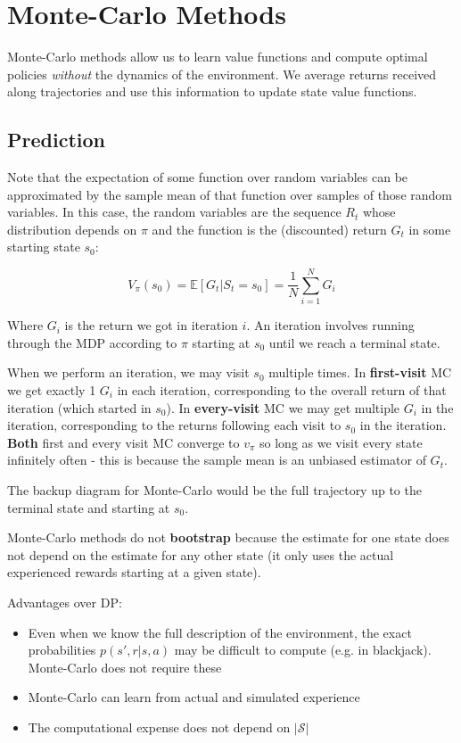 \documentclass[11pt]{report}
\begin{document}
\chapter{Monte-Carlo Methods}\label{sec:Monte-Carlo Methods}
Monte-Carlo methods allow us to learn value functions and compute optimal policies \textit{without} the dynamics of the environment. We average returns received along trajectories and use this information to update state value functions.

\section{Prediction}
Note that the expectation of some function over random variables can be approximated by the sample mean of that function over samples of those random variables. In this case, the random variables are the sequence $R_t$ whose distribution depends on $\pi$ and the function is the (discounted) return $G_t$ in some starting state $s_0$:

\begin{equation}
	\label{eqn:mc-update}
	V_\pi(s_0) = \mathbb{E}[G_t | S_t =s_0] = \frac{1}{N} \sum_{i=1}^{N}G_i
\end{equation}

Where $G_i$ is the return we got in iteration $i$. An iteration involves running through the MDP according to $\pi$ starting at $s_0$ until we reach a terminal state.

When we perform an iteration, we may visit $s_0$ multiple times. In \textbf{first-visit} MC we get exactly 1 $G_i$ in each iteration, corresponding to the overall return of that iteration (which started in $s_0$). In \textbf{every-visit} MC we may get multiple $G_i$ in the iteration, corresponding to the returns following each visit to $s_0$ in the iteration. \textbf{Both} first and every visit MC converge to $v_\pi$ so long as we visit every state infinitely often - this is because the sample mean is an unbiased estimator of $G_t$.

The backup diagram for Monte-Carlo would be the full trajectory up to the terminal state and starting at $s_0$.

Monte-Carlo methods do not \textbf{bootstrap} because the estimate for one state does not depend on the estimate for any other state (it only uses the actual experienced rewards starting at a given state).

Advantages over DP:

\begin{itemize}
	\item Even when we know the full description of the environment, the exact probabilities $p(s',r|s,a)$ may be difficult to compute (e.g. in blackjack). Monte-Carlo does not require these
	\item Monte-Carlo can learn from actual and simulated experience
	\item The computational expense does not depend on $|\mathcal{S}|$
\end{itemize}
\end{document}
